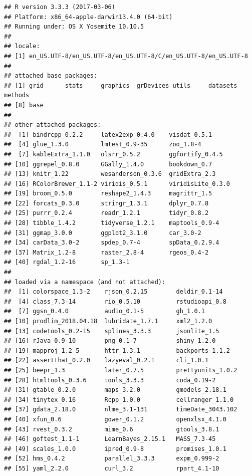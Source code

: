 \documentclass[12pt,a4paper,oneside, openany]{book}
\theoremstyle{definition}
\theoremstyle{definition}
\theoremstyle{definition}
\theoremstyle{remark}
\begin{document}
\begin{verbatim}
## R version 3.3.3 (2017-03-06)
## Platform: x86_64-apple-darwin13.4.0 (64-bit)
## Running under: OS X Yosemite 10.10.5
## 
## locale:
## [1] en_US.UTF-8/en_US.UTF-8/en_US.UTF-8/C/en_US.UTF-8/en_US.UTF-8
## 
## attached base packages:
## [1] grid      stats     graphics  grDevices utils     datasets  methods  
## [8] base     
## 
## other attached packages:
##  [1] bindrcpp_0.2.2     latex2exp_0.4.0    visdat_0.5.1      
##  [4] glue_1.3.0         lmtest_0.9-35      zoo_1.8-4         
##  [7] kableExtra_1.1.0   olsrr_0.5.2        ggfortify_0.4.5   
## [10] ggrepel_0.8.0      GGally_1.4.0       bookdown_0.7      
## [13] knitr_1.22         wesanderson_0.3.6  gridExtra_2.3     
## [16] RColorBrewer_1.1-2 viridis_0.5.1      viridisLite_0.3.0 
## [19] broom_0.5.0        reshape2_1.4.3     magrittr_1.5      
## [22] forcats_0.3.0      stringr_1.3.1      dplyr_0.7.8       
## [25] purrr_0.2.4        readr_1.2.1        tidyr_0.8.2       
## [28] tibble_1.4.2       tidyverse_1.2.1    maptools_0.9-4    
## [31] ggmap_3.0.0        ggplot2_3.1.0      car_3.0-2         
## [34] carData_3.0-2      spdep_0.7-4        spData_0.2.9.4    
## [37] Matrix_1.2-8       raster_2.8-4       rgeos_0.4-2       
## [40] rgdal_1.2-16       sp_1.3-1          
## 
## loaded via a namespace (and not attached):
##  [1] colorspace_1.3-2    rjson_0.2.15        deldir_0.1-14      
##  [4] class_7.3-14        rio_0.5.10          rstudioapi_0.8     
##  [7] ggsn_0.4.0          audio_0.1-5         gh_1.0.1           
## [10] prodlim_2018.04.18  lubridate_1.7.1     xml2_1.2.0         
## [13] codetools_0.2-15    splines_3.3.3       jsonlite_1.5       
## [16] rJava_0.9-10        png_0.1-7           shiny_1.2.0        
## [19] mapproj_1.2-5       httr_1.3.1          backports_1.1.2    
## [22] assertthat_0.2.0    lazyeval_0.2.1      cli_1.0.1          
## [25] beepr_1.3           later_0.7.5         prettyunits_1.0.2  
## [28] htmltools_0.3.6     tools_3.3.3         coda_0.19-2        
## [31] gtable_0.2.0        maps_3.2.0          gmodels_2.18.1     
## [34] tinytex_0.16        Rcpp_1.0.0          cellranger_1.1.0   
## [37] gdata_2.18.0        nlme_3.1-131        timeDate_3043.102  
## [40] xfun_0.6            gower_0.1.2         openxlsx_4.1.0     
## [43] rvest_0.3.2         mime_0.6            gtools_3.8.1       
## [46] goftest_1.1-1       LearnBayes_2.15.1   MASS_7.3-45        
## [49] scales_1.0.0        ipred_0.9-8         promises_1.0.1     
## [52] hms_0.4.2           parallel_3.3.3      expm_0.999-2       
## [55] yaml_2.2.0          curl_3.2            rpart_4.1-10       

\end{verbatim}
\end{document}

